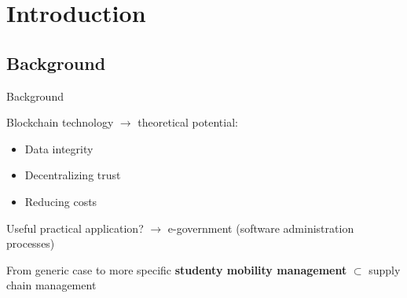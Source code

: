 

\section{Introduction}

\subsection{Background}


\begin{frame}[fragile]{Background}

  Blockchain technology $\rightarrow$ theoretical potential:
  \begin{itemize}
		\item Data integrity
		\item Decentralizing trust
		\item Reducing costs
  \end{itemize}
	
  Useful practical application? $\rightarrow$ \alert{e-government} (software administration processes)
    
   \begin{exampleblock}{From generic case to more specific}
    	\textbf{studenty mobility management} $\subset$ supply chain management
  \end{exampleblock}

\end{frame}

